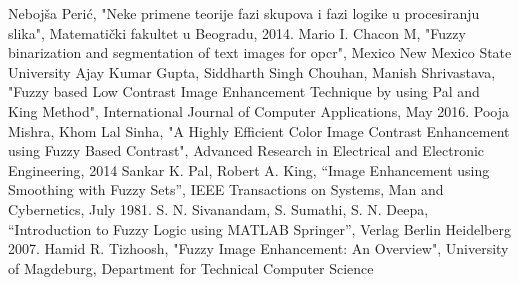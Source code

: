 \documentclass[12pt,a4paper]{article}
\theoremstyle{definition}
\theoremstyle{remark}
\theoremstyle{plain}
\begin{document}
\begin{thebibliography}{9}
  \bibitem{} Neboj\v sa Peri\' c, "Neke primene teorije fazi skupova i fazi logike u procesiranju slika", Matemati\v cki fakultet u Beogradu, 2014.
  \bibitem{} Mario I. Chacon M, "Fuzzy binarization and segmentation of text images for opcr", Mexico New Mexico State University
  \bibitem{} Ajay Kumar Gupta, Siddharth Singh Chouhan, Manish Shrivastava, "Fuzzy based Low Contrast Image Enhancement Technique by using Pal and King Method", International Journal of Computer Applications, May 2016.
  \bibitem{} Pooja Mishra, Khom Lal Sinha, "A Highly Efficient Color Image Contrast Enhancement using Fuzzy Based Contrast", Advanced Research in Electrical and Electronic Engineering, 2014
  \bibitem{} Sankar K. Pal, Robert A. King, “Image Enhancement using Smoothing with Fuzzy Sets”, IEEE Transactions on Systems, Man and Cybernetics, July 1981.
  \bibitem{} S. N. Sivanandam, S. Sumathi, S. N. Deepa, “Introduction to Fuzzy Logic using MATLAB Springer”, Verlag Berlin Heidelberg 2007.
  \bibitem{} Hamid R. Tizhoosh, "Fuzzy Image Enhancement: An Overview", University of Magdeburg, Department for Technical Computer Science
\end{thebibliography}
\end{document}
